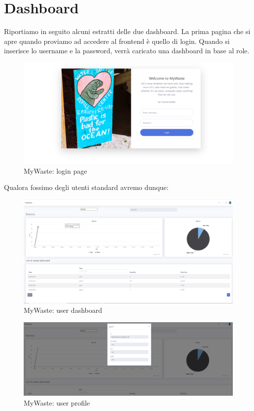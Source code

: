 \documentclass{report}
\begin{document}
\section{Dashboard}
Riportiamo in seguito alcuni estratti delle due dashboard.
La prima pagina che si apre quando proviamo ad accedere al frontend è quello di login.
Quando si inserisce lo username e la password, verrà caricato una dashboard in base al role.
\begin{figure}[h!]
    \begin{center}
        \includegraphics[width=1.0\textwidth]{images/login.PNG}  \end{center}
    \caption{MyWaste: login page}
    \label{fig: login}
\end{figure}
Qualora fossimo degli utenti standard avremo dunque:
\begin{figure}[h!]
    \begin{center}
        \includegraphics[width=1.0\textwidth]{images/userDashboard.PNG}  \end{center}
    \caption{MyWaste: user dashboard}
    \label{fig: userDashboard}
\end{figure}
\begin{figure}[h!]
    \begin{center}
        \includegraphics[width=1.0\textwidth]{images/userProfile.PNG}  \end{center}
    \caption{MyWaste: user profile}
    \label{fig: userProfile}
\end{figure}
\end{document}
